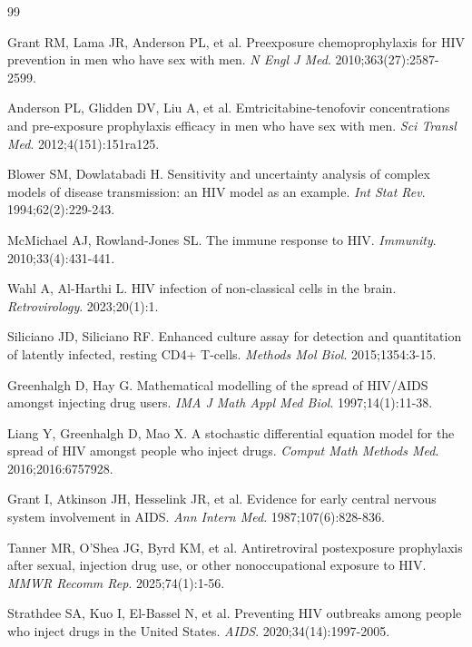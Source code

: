 \documentclass[12pt]{article}
\begin{document}

\begin{thebibliography}{99}

Grant RM, Lama JR, Anderson PL, et al. Preexposure chemoprophylaxis for HIV prevention in men who have sex with men. \textit{N Engl J Med}. 2010;363(27):2587-2599.

Anderson PL, Glidden DV, Liu A, et al. Emtricitabine-tenofovir concentrations and pre-exposure prophylaxis efficacy in men who have sex with men. \textit{Sci Transl Med}. 2012;4(151):151ra125.

Blower SM, Dowlatabadi H. Sensitivity and uncertainty analysis of complex models of disease transmission: an HIV model as an example. \textit{Int Stat Rev}. 1994;62(2):229-243.

McMichael AJ, Rowland-Jones SL. The immune response to HIV. \textit{Immunity}. 2010;33(4):431-441.

Wahl A, Al-Harthi L. HIV infection of non-classical cells in the brain. \textit{Retrovirology}. 2023;20(1):1.

Siliciano JD, Siliciano RF. Enhanced culture assay for detection and quantitation of latently infected, resting CD4+ T-cells. \textit{Methods Mol Biol}. 2015;1354:3-15.

Greenhalgh D, Hay G. Mathematical modelling of the spread of HIV/AIDS amongst injecting drug users. \textit{IMA J Math Appl Med Biol}. 1997;14(1):11-38.

Liang Y, Greenhalgh D, Mao X. A stochastic differential equation model for the spread of HIV amongst people who inject drugs. \textit{Comput Math Methods Med}. 2016;2016:6757928.

Grant I, Atkinson JH, Hesselink JR, et al. Evidence for early central nervous system involvement in AIDS. \textit{Ann Intern Med}. 1987;107(6):828-836.

Tanner MR, O'Shea JG, Byrd KM, et al. Antiretroviral postexposure prophylaxis after sexual, injection drug use, or other nonoccupational exposure to HIV. \textit{MMWR Recomm Rep}. 2025;74(1):1-56.

Strathdee SA, Kuo I, El-Bassel N, et al. Preventing HIV outbreaks among people who inject drugs in the United States. \textit{AIDS}. 2020;34(14):1997-2005.


\end{thebibliography}
\end{document}
